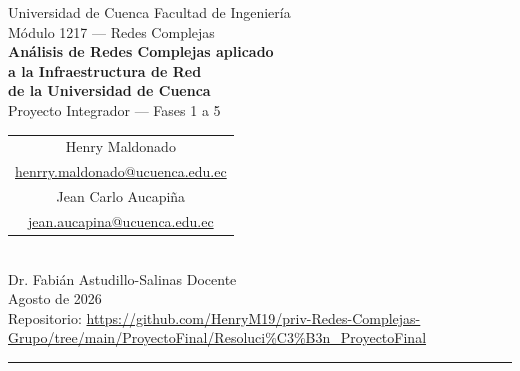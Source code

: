 \documentclass[11pt, a4paper]{article}
\newcommand{\autorsep}{\quad\textperiodcentered\quad}
\begin{document}
\thispagestyle{empty}

\begin{center}
    \vspace*{1cm}
    {\small Universidad de Cuenca \autorsep Facultad de Ingeniería}\\[0.4em]
    {\small Módulo 1217 --- Redes Complejas}\\[2em]

    {\LARGE\bfseries\color{azulsec}
        Análisis de Redes Complejas aplicado\\[0.3em]
        a la Infraestructura de Red\\[0.3em]
        de la Universidad de Cuenca%
    }\\[1.2em]

    {\large Proyecto Integrador --- Fases 1 a 5}\\[2em]

    \small
\begin{tabular}{c}
        Henry Maldonado\\
        {\small \href{mailto:henrry.maldonado@ucuenca.edu.ec}{henrry.maldonado@ucuenca.edu.ec}}\\[0.8em]
        Jean Carlo Aucapi\~{n}a\\
        {\small \href{mailto:jean.aucapina@ucuenca.edu.ec}{jean.aucapina@ucuenca.edu.ec}}\\
    \end{tabular}\\[2em]

    {\small Dr. Fabián Astudillo-Salinas \autorsep Docente}\\[0.5em]
    {\small Agosto de 2026}\\[1.5em]

    {\small Repositorio:
        \url{https://github.com/HenryM19/priv-Redes-Complejas-Grupo/tree/main/ProyectoFinal/Resoluci%C3%B3n_ProyectoFinal}
    }

    \vspace{2cm}
    \color{azulsec}\rule{0.6\linewidth}{1pt}
\end{center}

\newpage
\setcounter{page}{1}
\end{document}
